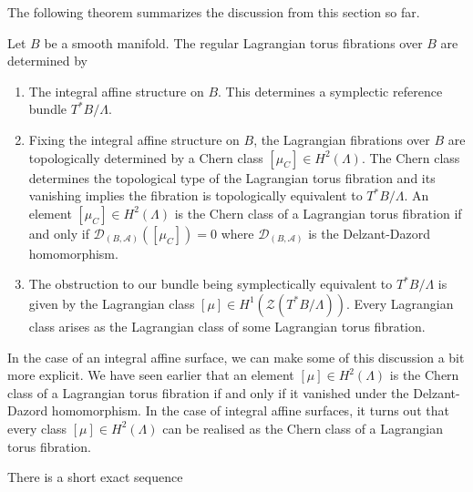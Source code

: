 The following theorem summarizes the discussion from this section so far.

\begin{theorem}
    Let $B$ be a smooth manifold. The regular Lagrangian torus fibrations over $B$ are determined by
    \begin{enumerate}
        \item The integral affine structure on $B$. This determines a symplectic reference
              bundle $T^*B/\Lambda$.
        \item Fixing the integral affine structure on $B$, the Lagrangian fibrations over $B$
              are topologically determined by a Chern class $[\mu_{C}] \in H^2(\Lambda)$. The
              Chern class determines the topological type of the Lagrangian torus fibration
              and its vanishing implies the fibration is topologically equivalent to
              $T^*B/\Lambda$. An element $[\mu_{C}] \in H^2(\Lambda)$ is the Chern class of a
              Lagrangian torus fibration if and only if $\mathcal{D}_{(B,
                  \mathcal{A})}([\mu_C]) = 0$ where $\mathcal{D}_{(B, \mathcal{A})}$ is the
              Delzant-Dazord homomorphism.
        \item The obstruction to our bundle being symplectically equivalent to $T^*B/\Lambda$
              is given by the Lagrangian class $[\mu] \in H^1(\mathcal{Z}(T^*B/\Lambda))$.
              Every Lagrangian class arises as the Lagrangian class of some Lagrangian torus
              fibration.
    \end{enumerate}
\end{theorem}

In the case of an integral affine surface, we can make some of this discussion
a bit more explicit. We have seen earlier that an element $[\mu]\in
    H^2(\Lambda)$ is the Chern class of a Lagrangian torus fibration if and only if
it vanished under the Delzant-Dazord homomorphism. In the case of integral
affine surfaces, it turns out that every class $[\mu] \in H^2(\Lambda)$ can be
realised as the Chern class of a Lagrangian torus fibration.

There is a short exact sequence

